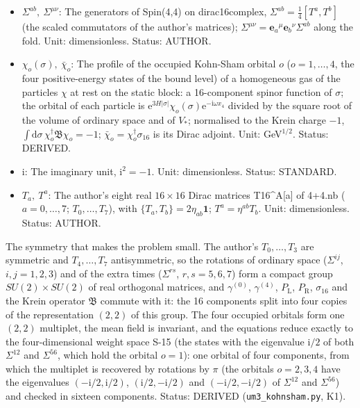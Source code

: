 \documentclass[
  10pt,
]{article}
\providecommand{\tightlist}{%
  \setlength{\itemsep}{0pt}\setlength{\parskip}{0pt}}
\begin{document}
\begin{itemize}
\tightlist
\item
  \(\Sigma^{ab},\ \Sigma^{\mu\nu}\): The generators of Spin(4,4) on
  dirac16complex, \(\Sigma^{ab} = \frac14[T^a, T^b]\) (the scaled
  commutators of the author's matrices);
  \(\Sigma^{\mu\nu} = \mathbf{e}_a{}^\mu\mathbf{e}_b{}^\nu\Sigma^{ab}\)
  along the fold. Unit: dimensionless. Status: AUTHOR.
\item
  \(\chi_o(\sigma),\ \bar\chi_o\): The profile of the occupied Kohn-Sham
  orbital \(o\) (\(o = 1, \dots, 4\), the four positive-energy states of
  the bound level) of a homogeneous gas of the particles \(\chi\) at
  rest on the static block: a 16-component spinor function of
  \(\sigma\); the orbital of each particle is
  \(\mathrm{e}^{3H\lvert\sigma\rvert}\chi_o(\sigma)\mathrm{e}^{-\mathrm{i}\omega x_4}\)
  divided by the square root of the volume of ordinary space and of
  \(V_*\); normalised to the Krein charge \(-1\),
  \(\int\mathrm{d}\sigma\,\chi_o^\dagger\mathfrak{B}\chi_o = -1\);
  \(\bar\chi_o = \chi_o^\dagger\sigma_{16}\) is its Dirac adjoint. Unit:
  GeV\(^{1/2}\). Status: DERIVED.
\item
  \(\mathrm{i}\): The imaginary unit, \(\mathrm{i}^2 = -1\). Unit:
  dimensionless. Status: STANDARD.
\item
  \(T_a,\ T^a\): The author's eight real \(16 \times 16\) Dirac matrices
  T16\^{}A{[}a{]} of 4+4.nb (\(a = 0, \dots, 7\); \(T_0, \dots, T_7\)),
  with \(\{T_a, T_b\} = 2\eta_{ab}\mathbf{1}\); \(T^a = \eta^{ab}T_b\).
  Unit: dimensionless. Status: AUTHOR.
\end{itemize}

The symmetry that makes the problem small. The author's
\(T_0, \dots, T_3\) are symmetric and \(T_4, \dots, T_7\) antisymmetric,
so the rotations of ordinary space (\(\Sigma^{ij}\), \(i, j = 1, 2, 3\))
and of the extra times (\(\Sigma^{rs}\), \(r, s = 5, 6, 7\)) form a
compact group \(SU(2) \times SU(2)\) of real orthogonal matrices, and
\(\gamma^{(0)}\), \(\gamma^{(4)}\), \(P_{\mathrm{L}}\),
\(P_{\mathrm{R}}\), \(\sigma_{16}\) and the Krein operator
\(\mathfrak{B}\) commute with it: the 16 components split into four
copies of the representation \((2, 2)\) of this group. The four occupied
orbitals form one \((2, 2)\) multiplet, the mean field is invariant, and
the equations reduce exactly to the four-dimensional weight space S-15
(the states with the eigenvalue \(\mathrm{i}/2\) of both \(\Sigma^{12}\)
and \(\Sigma^{56}\), which hold the orbital \(o = 1\)): one orbital of
four components, from which the multiplet is recovered by rotations by
\(\pi\) (the orbitals \(o = 2, 3, 4\) have the eigenvalues
\((-\mathrm{i}/2, \mathrm{i}/2)\), \((\mathrm{i}/2, -\mathrm{i}/2)\) and
\((-\mathrm{i}/2, -\mathrm{i}/2)\) of \(\Sigma^{12}\) and
\(\Sigma^{56}\)) and checked in sixteen components. Status: DERIVED
(\texttt{um3\_kohnsham.py}, K1).
\end{document}
